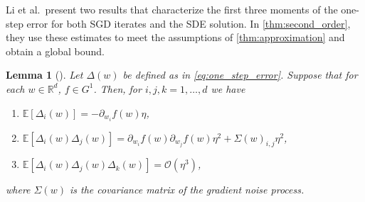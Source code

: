 \documentclass[12pt]{article}
\newtheorem{lemma}[lemma]{Lemma}
\theoremstyle{definition}
\numberwithin{equation}{section}
\newcommand{\R}{\mathbb{R}}
\newcommand{\CO}{\mathcal{O}}
\newcommand{\ev}[1]{\mathbb{E}\left[{#1}\right]}
\begin{document}
Li et al.\ present two results that characterize the first three moments of the one-step error for both SGD iterates and the SDE solution. In \autoref{thm:second_order}, they use these estimates to meet the assumptions of \autoref{thm:approximation} and obtain a global bound.
\begin{lemma}[]
  \label{lem:sgd_one_step}
  Let $\Delta(w)$ be defined as in \eqref{eq:one_step_error}. Suppose that for each $w \in \R^d$, $f \in G^1$. Then, for $i,j,k=1,\dots,d$ we have
  \begin{enumerate}[label=(\roman*)]
    \item $\ev{\Delta_{i}(w)} = -\partial_{w_i} f(w) \eta$,
    \item $\ev{\Delta_{i}(w)\Delta_{j}(w)} = \partial_{w_i} f(w)\partial_{w_j} f(w) \eta^2 + \Sigma(w)_{i,j}\eta^2$,
    \item $\ev{\Delta_{i}(w)\Delta_{j}(w)\Delta_{k}(w)} = \CO(\eta^3)$,
  \end{enumerate}
  where $\Sigma(w)$ is the covariance matrix of the gradient noise process.
\end{lemma}
\end{document}
